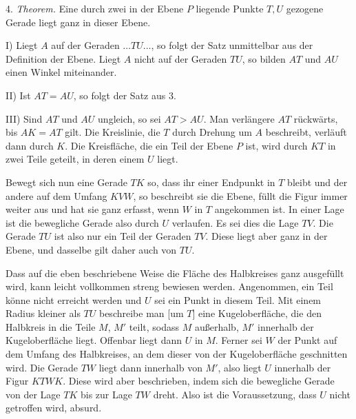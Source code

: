 4. \emph{Theorem.} Eine durch zwei in der Ebene $P$ liegende Punkte $T, U$
gezogene Gerade liegt ganz in dieser Ebene.

 I) Liegt $A$ auf der Geraden $\ldots TU \ldots$, so folgt der Satz unmittelbar aus
der Definition der Ebene. Liegt $A$ nicht auf der Geraden $TU$, so
bilden $AT$ und $AU$ einen Winkel miteinander.

II) Ist $AT = AU$, so folgt der Satz aus 3.

III) Sind $AT$ und $AU$ ungleich, so sei $AT > AU$. Man verlängere $AT$ rückwärts,
bis $AK = AT$ gilt. Die Kreislinie, die $T$ durch Drehung um $A$ beschreibt,
verläuft dann durch $K$. Die Kreisfläche, die ein Teil der Ebene $P$
ist, wird durch $KT$ in zwei Teile geteilt, in deren einem $U$ liegt.

\begin{center}

\end{center}

Bewegt sich nun eine Gerade $TK$ so, dass ihr einer Endpunkt in $T$ bleibt und
der andere auf dem Umfang $KVW$, so beschreibt sie die Ebene,
füllt die Figur immer weiter aus und hat sie ganz erfasst, wenn $W$ in $T$
angekommen ist. In einer Lage ist die bewegliche Gerade also durch $U$
verlaufen. Es sei dies die Lage $TV$. Die Gerade $TU$ ist also nur ein Teil
der Geraden $TV$. Diese liegt aber ganz in der Ebene, und dasselbe gilt daher
auch von $TU$.



Dass auf die eben beschriebene Weise die Fläche des Halbkreises ganz
ausgefüllt wird, kann leicht vollkommen streng bewiesen werden.
Angenommen, ein Teil könne nicht erreicht werden und $U$ sei ein Punkt in
diesem Teil. Mit einem Radius kleiner als $TU$ beschreibe man [um $T$] eine
Kugeloberfläche, die den Halbkreis in die Teile $M$, $M'$ teilt,
sodass $M$ außerhalb, $M'$ innerhalb der Kugeloberfläche liegt. Offenbar liegt
dann $U$ in $M$. Ferner sei $W$ der Punkt auf dem Umfang des Halbkreises,
an dem dieser von der Kugeloberfläche geschnitten wird. Die Gerade $TW$ liegt
dann innerhalb von $M'$, also liegt $U$ innerhalb der Figur $KTWK$. Diese wird aber
beschrieben, indem sich die bewegliche Gerade von der Lage $TK$ bis zur
Lage $TW$ dreht. Also ist die Voraussetzung, dass $U$ nicht getroffen wird,
absurd.

